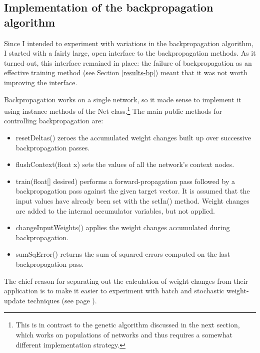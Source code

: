 \documentclass[a4paper]{report}
\newcommand{\code}[1]{{\ttfamily #1}}
\begin{document}
\subsection{Implementation of the backpropagation algorithm}
\label{impl-bp}

Since I intended to experiment with variations in the backpropagation
algorithm, I started with a fairly large, open interface to the
backpropagation methods. As it turned out, this interface remained in
place: the failure of backpropagation as an effective training method
(see Section \ref{results-bp}) meant that it was not worth improving
the interface.

Backpropagation works on a single network, so it made sense to
implement it using instance methods of the \code{Net}
class.\footnote{This is in contrast to the genetic algorithm discussed
  in the next section, which works on populations of networks and thus
  requires a somewhat different implementation strategy.} The main
public methods for controlling backpropagation are:

\begin{itemize}

\item \code{resetDeltas()} zeroes the accumulated weight changes built
  up over successive backpropagation passes.

\item \code{flushContext(float x)} sets the values of all the
  network's context nodes.

\item \code{train(float[] desired)} performs a forward-propagation
  pass followed by a backpropagation pass against the given target
  vector. It is assumed that the input values have already been set
  with the \code{setIn()} method. Weight changes are added to the
  internal accumulator variables, but not applied.

\item \code{changeInputWeights()} applies the weight changes
  accumulated during backpropagation.

\item \code{sumSqError()} returns the sum of squared errors computed
  on the last backpropagation pass.

\end{itemize}

The chief reason for separating out the calculation of weight changes
from their application is to make it easier to experiment with batch
and stochastic weight-update techniques (see page
\pageref{theory-bp-batch}).
\end{document}
